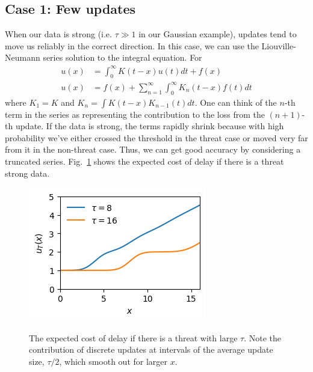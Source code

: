 \documentclass[12pt, letterpaper]{article}
\begin{document}
\subsection{Case 1: Few updates}

When our data is strong (i.e. $\tau \gg 1$ in our Gaussian example), updates tend to move us reliably in the correct direction.
In this case, we can use the Liouville-Neumann series solution to the integral equation.
For
\begin{align}
    u(x) &= \int_0^{\infty} K(t - x) u(t) dt + f(x) \\
    u(x) &= f(x) + \sum_{n=1}^{\infty} \int_0^{\infty} K_n(t - x) f(t) dt
    \label{eq:ln_series}
\end{align}
where $K_1 = K$ and $K_n = \int K(t - x) K_{n-1}(t) dt$.
One can think of the $n$-th term in the series as representing the contribution to the loss from the $(n+1)$-th update.
If the data is strong, the terms rapidly shrink because with high probability we've either crossed the threshold in the threat case or moved very far from it in the non-threat case.
Thus, we can get good accuracy by considering a truncated series.
Fig.~\ref{fig:large_updates} shows the expected cost of delay if there is a threat strong data.

\begin{figure}
    \centering
    \includegraphics{large_updates}
    \label{fig:large_updates}
    \caption{The expected cost of delay if there is a threat with large $\tau$. Note the contribution of discrete updates at intervals of the average update size, $\tau / 2$, which smooth out for larger $x$.}
\end{figure}
\end{document}

